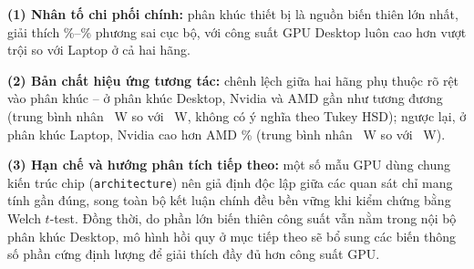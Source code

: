 \textbf{(1) Nhân tố chi phối chính:} phân khúc thiết bị là nguồn biến thiên lớn nhất, giải
thích \AnovaRawEtaSegPct{}\%--\AnovaLogEtaSegPct{}\% phương sai cục bộ, với công suất GPU
Desktop luôn cao hơn vượt trội so với Laptop ở cả hai hãng.

\textbf{(2) Bản chất hiệu ứng tương tác:} chênh lệch giữa hai hãng phụ thuộc rõ rệt vào
phân khúc -- ở phân khúc Desktop, Nvidia và AMD gần như tương đương (trung bình nhân
\AnovaGeomNvidiaDesktop{}~W so với \AnovaGeomAmdDesktop{}~W, không có ý nghĩa theo Tukey
HSD); ngược lại, ở phân khúc Laptop, Nvidia cao hơn AMD \AnovaLaptopGeomGapPct{}\% (trung
bình nhân \AnovaGeomNvidiaLaptop{}~W so với \AnovaGeomAmdLaptop{}~W).

\textbf{(3) Hạn chế và hướng phân tích tiếp theo:} một số mẫu GPU dùng chung kiến trúc
chip (\texttt{architecture}) nên giả định độc lập giữa các quan sát chỉ mang tính gần
đúng, song toàn bộ kết luận chính đều bền vững khi kiểm chứng bằng Welch $t$-test. Đồng
thời, do phần lớn biến thiên công suất vẫn nằm trong nội bộ phân khúc Desktop, mô hình
hồi quy ở mục tiếp theo sẽ bổ sung các biến thông số phần cứng định lượng để giải thích
đầy đủ hơn công suất GPU.
